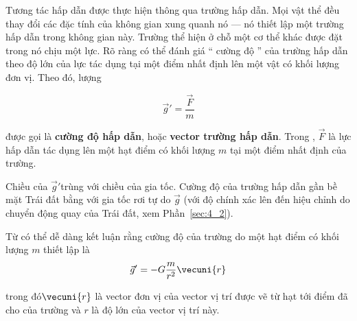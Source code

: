 Tương tác hấp dẫn được thực hiện thông qua trường hấp dẫn. Mọi vật thể đều thay đổi các đặc tính của không gian xung quanh nó --- nó thiết lập một trường hấp dẫn trong không gian này. Trường thể hiện ở chỗ một cơ thể khác được đặt trong nó chịu một lực. Rõ ràng có thể đánh giá `` cường độ '' của trường hấp dẫn theo độ lớn của lực tác dụng tại một điểm nhất định lên một vật có khối lượng đơn vị. Theo đó, lượng

\begin{equation}\label{eq:6_6}
	\vec{g}' = \frac{\vec{F}}{m}
\end{equation}

\noindent
được gọi là \textbf{cường độ hấp dẫn}, hoặc \textbf{vector trường hấp dẫn}. Trong  , $\vec{F}$ là lực hấp dẫn tác dụng lên một hạt điểm có khối lượng $m$ tại một điểm nhất định của trường.

Chiều của  $\vec{g}'$trùng với chiều của gia tốc. Cường độ của trường hấp dẫn gần bề mặt Trái đất bằng với gia tốc rơi tự do $\vec{g}$ (với độ chính xác lên đến hiệu chỉnh do chuyển động quay của Trái đất, xem Phần~\ref{sec:4_2}).

Từ  có thể dễ dàng kết luận rằng cường độ của trường do một hạt điểm có khối lượng $m$ thiết lập là
\begin{equation}\label{eq:6_7}
	\vec{g}' = -G\frac{m}{r^2}\vecuni{r}
\end{equation}

\noindent
trong đó$\vecuni{r}$ là vector đơn vị của vector vị trí được vẽ từ hạt tới điểm đã cho của trường và $r$ là độ lớn của vector vị trí này.

